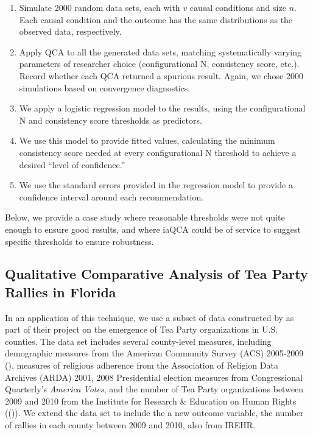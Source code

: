 \documentclass[]{article}
\begin{document}
{\begin{enumerate}
  \item Simulate 2000 random data sets, each with $v$ causal conditions and size $n$. Each causal condition and the outcome has the same distributions as the observed data, respectively. 
  \item Apply QCA to all the generated data sets, matching systematically varying parameters of researcher choice (configurational N, consistency score, etc.). Record whether each QCA returned a spurious result. Again, we chose 2000 simulations based on \cite{gelman_and_rubin_1992} convergence diagnostics. 
  \item We apply a logistic regression model to the results, using the configurational N and consistency score thresholds as predictors.
  \item We use this model to provide fitted values, calculating the minimum consistency score needed at every configurational N threshold to achieve a desired ``level of confidence.'' 
  \item We use the standard errors provided in the regression model to provide a confidence interval around each recommendation.
\end{enumerate}

Below, we provide a case study where reasonable thresholds were not quite enough to ensure good results, and where iaQCA could be of service to suggest specific thresholds to ensure robustness. 


\subsection{Qualitative Comparative Analysis of Tea Party Rallies in Florida}


In an application of this technique, we use a subset of data constructed by \citet{mcveigh_et_al_2014a} as part of their project on the emergence of Tea Party organizations in U.S. counties. The data set includes several county-level measures, including demographic measures from the American Community Survey (ACS) 2005-2009 (\citealt{acs_2009}), measures of religious adherence from the Association of Religion Data Archives (ARDA) 2001, 2008 Presidential election measures from Congressional Quarterly's {\it{America Votes}}, and the number of Tea Party organizations between 2009 and 2010 from the Institute for Research \& Education on Human Rights ((\citealt{irehr_2011})). We extend the data set to include the a new outcome variable, the number of rallies in each county between 2009 and 2010, also from IREHR. 

}
\end{document}
